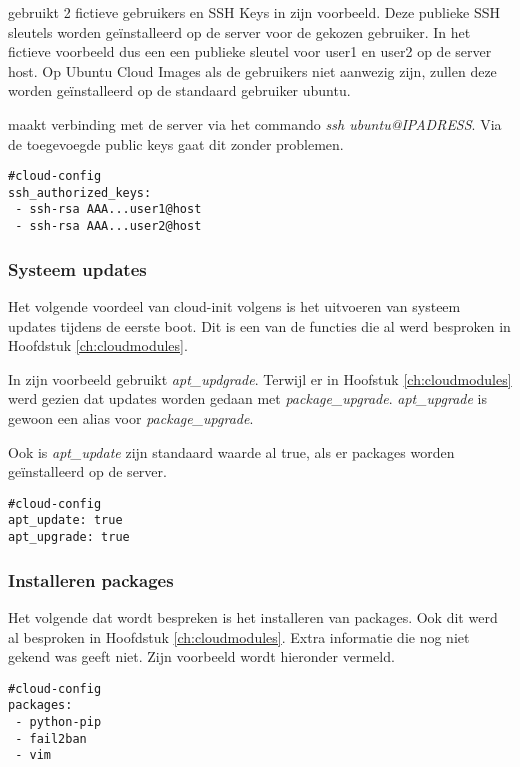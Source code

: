 \autocite{viktorpet} gebruikt 2 fictieve gebruikers en SSH Keys in zijn voorbeeld. Deze publieke SSH sleutels worden geïnstalleerd op de server voor de gekozen gebruiker. In het fictieve voorbeeld dus een een publieke sleutel voor user1 en user2 op de server host. Op Ubuntu Cloud Images als de gebruikers niet aanwezig zijn, zullen deze worden geïnstalleerd op de standaard gebruiker ubuntu. 

\autocite{viktorpet} maakt verbinding met de server via het commando \textit{ssh ubuntu@IPADRESS}. Via de toegevoegde public keys gaat dit zonder problemen.
\begin{lstlisting}[basicstyle=\small]
#cloud-config
ssh_authorized_keys:
 - ssh-rsa AAA...user1@host
 - ssh-rsa AAA...user2@host
\end{lstlisting} 

\newpage
\subsubsection{Systeem updates}
Het volgende voordeel van cloud-init volgens \autocite{viktorpet} is het uitvoeren van systeem updates tijdens de eerste boot. Dit is een van de functies die al werd besproken in Hoofdstuk \ref*{ch:cloudmodules}.

In zijn voorbeeld gebruikt \autocite{viktorpet} \textit{apt\_updgrade}. Terwijl er in Hoofstuk \ref*{ch:cloudmodules} werd gezien dat updates worden gedaan met \textit{package\_upgrade}. \textit{apt\_upgrade} is gewoon een alias voor \textit{package\_upgrade}.

Ook is \textit{apt\_update} zijn standaard waarde al true, als er packages worden geïnstalleerd op de server. 
\begin{lstlisting}[basicstyle=\small]
#cloud-config
apt_update: true
apt_upgrade: true
\end{lstlisting} 

\subsubsection{Installeren packages}
Het volgende dat wordt bespreken is het installeren van packages. Ook dit werd al besproken in Hoofdstuk \ref*{ch:cloudmodules}. Extra informatie die nog niet gekend was geeft \autocite{viktorpet} niet. Zijn voorbeeld wordt hieronder vermeld.
\begin{lstlisting}[basicstyle=\small]
#cloud-config
packages:
 - python-pip
 - fail2ban
 - vim
\end{lstlisting} 

